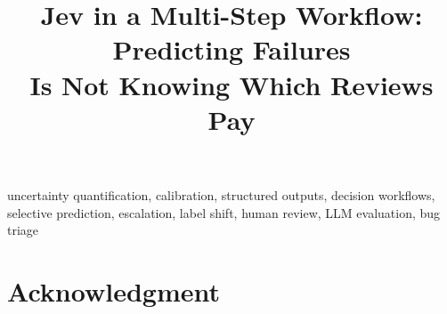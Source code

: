 \documentclass[conference]{IEEEtran}
\title{Jev in a Multi-Step Workflow: Predicting Failures\\
Is Not Knowing Which Reviews Pay}
\author{\IEEEauthorblockN{Thejas P Rao}
\IEEEauthorblockA{\texttt{thejasrao262003@gmail.com}}
\and
\IEEEauthorblockN{Tushar M}
\IEEEauthorblockA{\texttt{tusharm3040@gmail.com}}}
\begin{document}
\maketitle
\begin{abstract}

\end{abstract}
\begin{IEEEkeywords}
uncertainty quantification, calibration, structured outputs, decision workflows,
selective prediction, escalation, label shift, human review, LLM evaluation, bug triage
\end{IEEEkeywords}

\appendices

\FloatBarrier
\section*{Acknowledgment}

\balance

\let\OLDthebibliography\thebibliography
\renewcommand\thebibliography[1]{\OLDthebibliography{#1}\setlength{\itemsep}{0pt}\setlength{\parskip}{0pt}}

\end{document}
